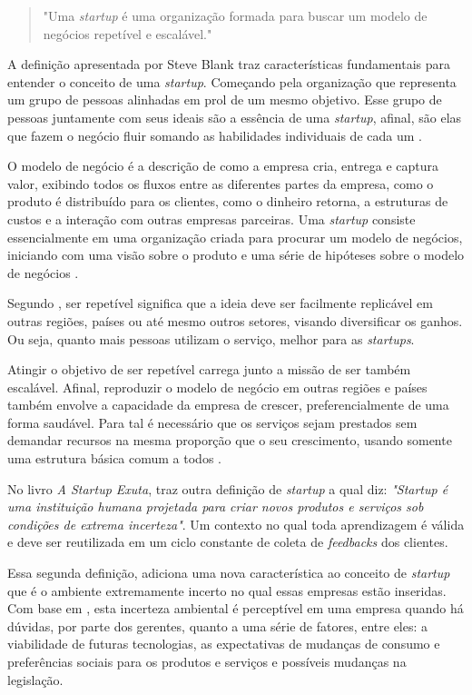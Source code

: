   \begin{quotation}
  "Uma \textit{startup} é uma organização formada para buscar um modelo de 
  negócios repetível e escalável." \cite{SteveBlankFirstPrinciples}
  \end{quotation}

A definição apresentada por Steve Blank traz características
fundamentais para entender o conceito de uma \textit{startup}. Começando
pela organização que representa um grupo de pessoas alinhadas em prol
de um mesmo objetivo. Esse grupo de pessoas juntamente com seus ideais
são a essência de uma \textit{startup}, afinal, são elas que fazem
o negócio fluir somando as habilidades individuais de cada um
\cite{ARevolucaoDasStartups}.

O modelo de negócio é a descrição de como a empresa cria, entrega e captura
valor, exibindo todos os fluxos entre as diferentes partes da empresa,
como o produto é distribuído para os clientes, como o dinheiro retorna, a
estruturas de custos e a interação com outras empresas parceiras. Uma
\textit{startup} consiste essencialmente em uma organização criada para
procurar um modelo de negócios, iniciando com uma visão sobre o produto e
uma série de hipóteses sobre o modelo de negócios
\cite{SteveBlankFirstPrinciples}.

Segundo , ser repetível significa que 
a ideia deve ser facilmente replicável em outras regiões, países ou até
mesmo outros setores, visando diversificar os ganhos. Ou seja, quanto mais
pessoas utilizam o serviço, melhor para as \textit{startups}.

Atingir o objetivo de ser repetível carrega junto a missão de ser também
escalável. Afinal, reproduzir o modelo de negócio em outras regiões e países
também envolve a capacidade da empresa de crescer, preferencialmente de uma
forma saudável. Para tal é necessário que os serviços sejam prestados sem
demandar recursos na mesma proporção que o seu crescimento, usando somente 
uma estrutura básica comum a todos \cite{CassioSpina}.

No livro \textit{A Startup Exuta},  traz outra
definição de \textit{startup} a qual diz: \textit{"Startup é uma instituição
humana projetada para criar novos produtos e serviços sob condições de extrema
incerteza"}. Um contexto no qual toda aprendizagem é válida e deve ser
reutilizada em um ciclo constante de coleta de \textit{feedbacks} dos clientes.

Essa segunda definição, adiciona uma nova característica ao conceito de
\textit{startup} que é o ambiente extremamente incerto no qual essas empresas
estão inseridas. Com base em  , esta incerteza
ambiental é perceptível em uma empresa quando há dúvidas, por parte dos gerentes,
quanto a uma série de fatores, entre eles: a viabilidade de futuras tecnologias,
as expectativas de mudanças de consumo e preferências sociais para os produtos
e serviços e possíveis mudanças na legislação.

